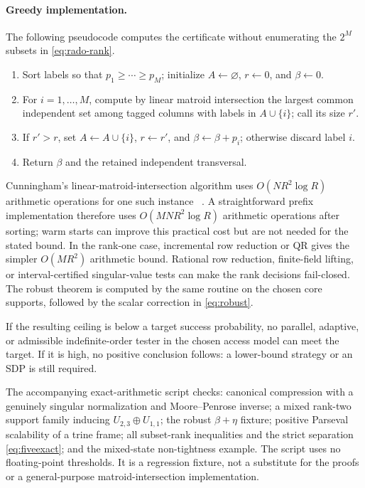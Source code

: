 \documentclass[11pt]{article}
\theoremstyle{definition}
\theoremstyle{remark}
\begin{document}
\paragraph{Greedy implementation.}
The following pseudocode computes the certificate without enumerating the
$2^M$ subsets in \cref{eq:rado-rank}.
\begin{center}
\begin{minipage}{0.88\linewidth}
\small
\begin{enumerate}
\item Sort labels so that $p_1\geq\cdots\geq p_M$; initialize
      $A\gets\varnothing$, $r\gets0$, and $\beta\gets0$.
\item For $i=1,\ldots,M$, compute by linear matroid intersection the largest
      common independent set among tagged columns with labels in
      $A\cup\{i\}$; call its size $r'$.
\item If $r'>r$, set $A\gets A\cup\{i\}$, $r\gets r'$, and
      $\beta\gets\beta+p_i$; otherwise discard label $i$.
\item Return $\beta$ and the retained independent transversal.
\end{enumerate}
\end{minipage}
\end{center}
Cunningham's linear-matroid-intersection algorithm uses
$O(NR^2\log R)$ arithmetic operations for one such instance
~\cite{cunningham1986}.  A straightforward prefix implementation therefore
uses $O(MNR^2\log R)$ arithmetic operations after sorting; warm starts can
improve this practical cost but are not needed for the stated bound.  In the
rank-one case, incremental row reduction or QR gives the simpler
$O(MR^2)$ arithmetic bound.  Rational row reduction, finite-field lifting, or
interval-certified singular-value tests can make the rank decisions
fail-closed.  The robust theorem is computed by the same routine on the chosen
core supports, followed by the scalar correction in \cref{eq:robust}.

If the resulting ceiling is below a target success probability, no parallel,
adaptive, or admissible indefinite-order tester in the chosen access model can
meet the target.  If it is high, no positive conclusion follows: a lower-bound
strategy or an SDP is still required.

The accompanying exact-arithmetic script checks: canonical compression with a
genuinely singular normalization and Moore--Penrose inverse; a mixed rank-two
support family inducing $U_{2,3}\oplus U_{1,1}$; the robust
$\beta+\eta$ fixture; positive Parseval scalability of a trine frame; all
subset-rank inequalities and the strict separation \cref{eq:fiveexact}; and
the mixed-state non-tightness example.  The script uses no floating-point
thresholds.  It is a regression fixture, not a substitute for the proofs or a
general-purpose matroid-intersection implementation.
\end{document}
